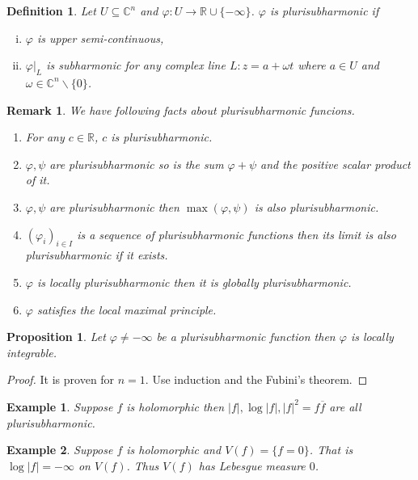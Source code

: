 \documentclass{article}
\newtheorem{proposition}{Proposition}[section]
\newtheorem{definition}{Definition}[section]
\newtheorem{remark}{Remark}[section]
\newtheorem{example}{Example}[section]
\newcommand{\R}[0]{\mathbb{R}}
\newcommand{\C}[0]{\mathbb{C}}
\begin{document}
\begin{definition}
  Let $U\subseteq\C^n$ and $\varphi:U\to\R\cup\{-\infty\}$. $\varphi$ is plurisubharmonic if 
  \begin{enumerate}[i).]
    \item $\varphi$ is upper semi-continuous,
    \item $\varphi|_L$ is subharmonic for any complex line $L:z=a+\omega t$ where $a\in U$ and $\omega\in\C^n\backslash\{0\}$.
  \end{enumerate}
\end{definition}

\begin{remark}
  We have following facts about plurisubharmonic funcions.
  \begin{enumerate}[1).]
    \item For any $c\in\R$, $c$ is plurisubharmonic.
    \item $\varphi,\psi$ are plurisubharmonic so is the sum $\varphi+\psi$ and the positive scalar product of it.
    \item $\varphi,\psi$ are plurisubharmonic then $\max(\varphi,\psi)$ is also plurisubharmonic.
    \item $(\varphi_i)_{i\in I}$ is a sequence of plurisubharmonic functions then its limit is also plurisubharmonic if it exists.
    \item $\varphi$ is locally plurisubharmonic then it is globally plurisubharmonic.
    \item $\varphi$ satisfies the local maximal principle.
  \end{enumerate}
\end{remark}

\begin{proposition}
  Let $\varphi\not=-\infty$ be a plurisubharmonic function then $\varphi$ is locally integrable.
\end{proposition}

\begin{proof}
  It is proven for $n=1$. Use induction and the Fubini's theorem.
\end{proof}

\begin{example}
  Suppose $f$ is holomorphic then $\vert f\vert,\log\vert f\vert,\vert f\vert^2 = f\overline{f}$ are all plurisubharmonic.
\end{example}

\begin{example}
  Suppose $f$ is holomorphic and $V(f) = \{f=0\}$. That is $\log\vert f\vert = -\infty$ on $V(f)$. Thus $V(f)$ has Lebesgue measure $0$.
\end{example}
\end{document}

